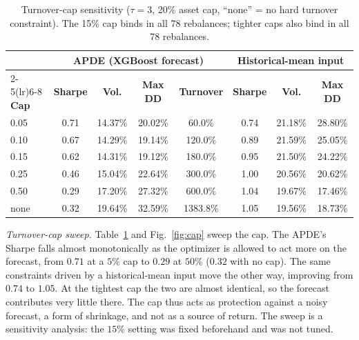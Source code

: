 \documentclass[conference]{IEEEtran}
\begin{document}
\begin{table}[t]
\caption{Turnover-cap sensitivity ($\tau=3$, 20\% asset cap, ``none'' =
no hard turnover constraint). The 15\% cap binds in all 78 rebalances;
tighter caps also bind in all 78 rebalances.}
\label{tab:cap}
\centering
\footnotesize
\setlength{\tabcolsep}{5pt}
\renewcommand{\arraystretch}{1.15}
\begin{tabular}{@{}lccccccc@{}}
\toprule
 & \multicolumn{4}{c}{\textbf{APDE (XGBoost forecast)}} & \multicolumn{3}{c}{\textbf{Historical-mean input}} \\
\cmidrule(lr){2-5}\cmidrule(lr){6-8}
\textbf{Cap} & \textbf{Sharpe} & \textbf{Vol.} & \textbf{Max DD} & \textbf{Turnover} & \textbf{Sharpe} & \textbf{Vol.} & \textbf{Max DD} \\
\midrule
0.05 & 0.71 & 14.37\% & 20.02\% & 60.0\%   & 0.74 & 21.18\% & 28.80\% \\
0.10 & 0.67 & 14.29\% & 19.14\% & 120.0\%  & 0.89 & 21.59\% & 25.05\% \\
0.15 & 0.62 & 14.31\% & 19.12\% & 180.0\%  & 0.95 & 21.50\% & 24.22\% \\
0.25 & 0.46 & 15.04\% & 22.64\% & 300.0\%  & 1.00 & 20.56\% & 20.62\% \\
0.50 & 0.29 & 17.20\% & 27.32\% & 600.0\%  & 1.04 & 19.67\% & 17.46\% \\
none & 0.32 & 19.64\% & 32.59\% & 1383.8\% & 1.05 & 19.56\% & 18.73\% \\
\bottomrule
\end{tabular}
\end{table}

\emph{Turnover-cap sweep.} Table~\ref{tab:cap} and Fig.~\ref{fig:cap}
sweep the cap. The APDE's Sharpe falls almost monotonically as the
optimizer is allowed to act more on the forecast, from $0.71$ at a
$5\%$ cap to $0.29$ at $50\%$ ($0.32$ with no cap). The same
constraints driven by a historical-mean input move the other way,
improving from $0.74$ to $1.05$. At the tightest cap the two are almost
identical, so the forecast contributes very little there. The cap thus
acts as protection against a noisy forecast, a form of shrinkage, and
not as a source of return. The sweep is a sensitivity analysis: the
$15\%$ setting was fixed beforehand and was not tuned.
\end{document}
